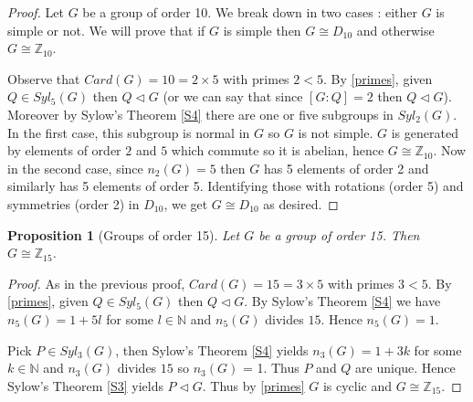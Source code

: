 \documentclass{article}
\theoremstyle{definition}
\theoremstyle{plain}
\theoremstyle{plain}
\theoremstyle{plain}
\theoremstyle{plain}
\theoremstyle{definition}
\theoremstyle{plain}
\theoremstyle{plain}
\newtheorem{propeng}[subsubsection]{Proposition}
\begin{document}
\begin{proof}
	Let \( G \) be a group of order 10. We break down in two cases : either \( G \) is simple or not. We will prove that if \( G \) is simple then \( G \cong D_{10} \) and otherwise \( G \cong \mathbb{Z}_{10} \).

	Observe that \( Card(G) = 10 = 2 \times 5 \) with primes \( 2 < 5\). By \cref{primes}, given \( Q \in Syl_5(G) \) then \( Q \triangleleft G \) (or we can say that since \( [G:Q] = 2 \) then \( Q \triangleleft G \)).
	Moreover by Sylow's Theorem \ref{S4} there are one or five subgroups in \( Syl_2(G) \). In the first case, this subgroup is normal in \( G \) so \( G \) is not simple. \( G \) is generated by elements of order \( 2 \) and \( 5 \) which commute so it is abelian, hence \( G \cong \mathbb{Z}_{10} \). Now in the second case, since \( n_2(G) = 5 \) then \( G \) has 5 elements of order 2 and similarly has 5 elements of order 5. Identifying those with rotations (order 5) and symmetries (order 2) in \( D_{10} \), we get \( G \cong D_{10} \) as desired.
\end{proof} 

\begin{propeng}[Groups of order 15]
Let \( G \) be a group of order 15. Then \( G \cong \mathbb{Z}_{15} \).
\end{propeng}

\begin{proof}
	As in the previous proof, \( Card(G) = 15 = 3 \times 5 \) with primes \( 3 < 5 \). By \cref{primes}, given \( Q \in Syl_5(G) \) then \( Q \triangleleft G \). By Sylow's Theorem \ref{S4} we have \( n_5(G) = 1 + 5l \) for some \( l \in \mathbb{N} \) and \( n_5(G) \) divides \( 15 \). Hence \( n_5(G) = 1 \). 

	Pick \( P \in Syl_3(G) \), then Sylow's Theorem \ref{S4} yields \( n_3(G) = 1 + 3k \) for some \( k \in \mathbb{N} \) and \( n_3(G) \) divides \( 15 \) so \( n_3(G) \) = 1. Thus \( P \) and \( Q \) are unique. Hence Sylow's Theorem \ref{S3} yields \( P \triangleleft G \). Thus by \cref{primes} \( G \) is cyclic and \( G \cong \mathbb{Z}_{15} \).
\end{proof}



\clearpage

\printbibliography[heading=bibintoc]
\end{document}
